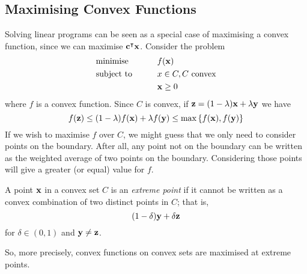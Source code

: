 \subsection{Maximising Convex Functions}
Solving linear programs can be seen as a special case of maximising a convex function, since we can maximise \( \vb c^\intercal \vb x \). Consider the problem
\begin{alignat*}{2}
    & \text{minimise} & \qquad & f(\vb x) \\
    & \text{subject to}                                &        & x \in C, C \text{ convex} \\
    & & & \vb x \geq 0
\end{alignat*}
where \( f \) is a convex function. Since \( C \) is convex, if \( \vb z = (1 - \lambda) \vb x + \lambda\vb y \) we have
\[ f(\vb z) \leq (1 - \lambda) f(\vb x) + \lambda f(\vb y) \leq \max\qty{f(\vb x), f(\vb y)} \]
If we wish to maximise \( f \) over \( C \), we might guess that we only need to consider points on the boundary. After all, any point not on the boundary can be written as the weighted average of two points on the boundary. Considering those points will give a greater (or equal) value for \( f \).
\begin{definition}
    A point \( \vb x \) in a convex set \( C \) is an \textit{extreme point} if it cannot be written as a convex combination of two distinct points in \( C \); that is,
    \[ (1 - \delta) \vb y + \delta \vb z \]
    for \( \delta \in (0, 1) \) and \( \vb y \neq \vb z \).
\end{definition}
So, more precisely, convex functions on convex sets are maximised at extreme points.

